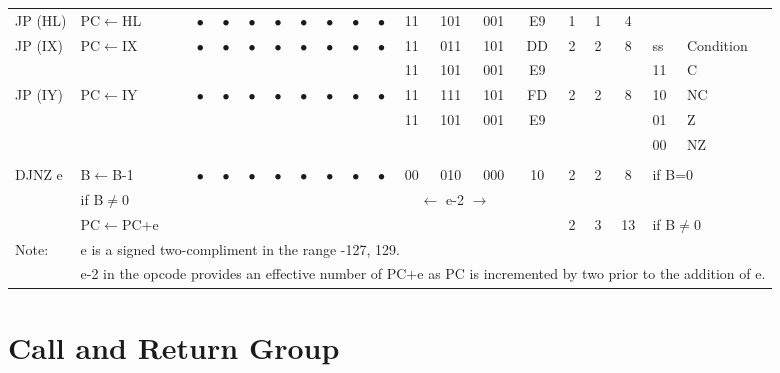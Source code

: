 \documentclass[oneside,a4paper]{book}
\begin{document}
{\begin{tabular}{llc@{ }c@{ }c@{ }c@{ }c@{ }c@{ }c@{ }cc@{ }c@{ }cccccll}
JP (HL) & PC$\leftarrow$HL &
	$\bullet$ & $\bullet$ & $\bullet$ & $\bullet$ & $\bullet$ & $\bullet$ & $\bullet$ & $\bullet$ & 11 & 101 & 001 
	& E9 & 1 & 1 & 4 & & \\

JP (IX) & PC$\leftarrow$IX &
	$\bullet$ & $\bullet$ & $\bullet$ & $\bullet$ & $\bullet$ & $\bullet$ & $\bullet$ & $\bullet$ & 11 & 011 & 101 
	& DD & 2 & 2 & 8 & ss & Condition \\ \cline{18-19}
\multicolumn{10}{c}{} & 11 & 101 & 001 & E9 & \multicolumn{3}{c}{} & 11 & C \\

JP (IY) & PC$\leftarrow$IY &
	$\bullet$ & $\bullet$ & $\bullet$ & $\bullet$ & $\bullet$ & $\bullet$ & $\bullet$ & $\bullet$ & 11 & 111 & 101 
	& FD & 2 & 2 & 8 & 10 & NC \\
\multicolumn{10}{c}{} & 11 & 101 & 001 & E9 & \multicolumn{3}{c}{} & 01 & Z \\
\multicolumn{17}{c}{} & 00 & NZ \\
\multicolumn{17}{c}{} & & \\

DJNZ e & B$\leftarrow$B-1 &
	$\bullet$ & $\bullet$ & $\bullet$ & $\bullet$ & $\bullet$ & $\bullet$ & $\bullet$ & $\bullet$ & 00 & 010 & 000
	& 10 & 2 & 2 & 8 & \multicolumn{2}{l}{if B=0} \\
 & if B$\not=$0 & \multicolumn{8}{c}{} & \multicolumn{3}{c}{$\leftarrow$ e-2 $\rightarrow$} & & & & &  & \\
 & PC$\leftarrow$PC+e & \multicolumn{8}{c}{} & \multicolumn{3}{c}{} & & 2 & 3 & 13 & 
	\multicolumn{2}{l}{if B$\not=$0} \\ \hline

Note: & \multicolumn{18}{l}{\parbox{12cm}{e is a signed two-compliment in the range -127, 129.}} \\
      & \multicolumn{18}{l}{\parbox{12cm}{e-2 in the opcode provides an effective number of PC+e as PC is incremented 
	by two prior to the addition of e.}} \\[1ex] \hline
\end{tabular}
}

\section{Call and Return Group}
\end{document}
